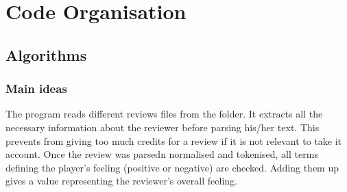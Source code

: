 \documentclass[paper=a4,fontsize=12pt]{report}
\begin{document}
\chapter{Code Organisation}
\section{Algorithms}
\subsection{Main ideas}
The program reads different reviews files from the folder. It extracts all the necessary information about the reviewer before parsing his/her text. This prevents from giving too much credits for a review if it is not relevant to take it account. Once the review was parsedn normalised and tokenised, all terms defining the player's feeling (positive or negative) are checked. Adding them up gives a value representing the reviewer's overall feeling.
\\
\end{document}
